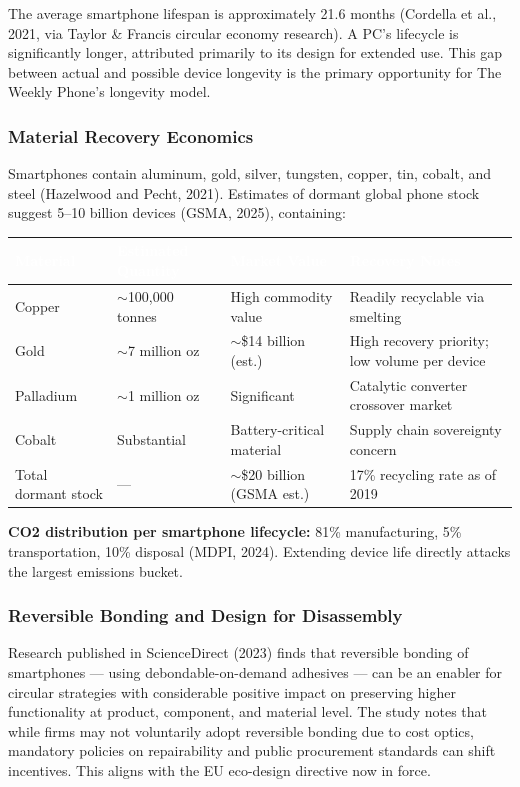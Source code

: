 \documentclass[11pt,letterpaper]{article}
\newcommand{\tableheader}[1]{\textbf{\sffamily\textcolor{white}{#1}}}
\begin{document}
The average smartphone lifespan is approximately 21.6 months (Cordella et al., 2021, via Taylor \& Francis circular economy research). A PC's lifecycle is significantly longer, attributed primarily to its design for extended use. This gap between actual and possible device longevity is the primary opportunity for The Weekly Phone's longevity model.

\subsubsection{Material Recovery Economics}

Smartphones contain aluminum, gold, silver, tungsten, copper, tin, cobalt, and steel (Hazelwood and Pecht, 2021). Estimates of dormant global phone stock suggest 5--10 billion devices (GSMA, 2025), containing:

\begin{center}
\begin{tabularx}{\textwidth}{L{3cm}C{3cm}C{3cm}X}
\toprule
{}
\tableheader{Material} & \tableheader{Estimated Quantity} & \tableheader{Market Value} & \tableheader{Recovery Notes} \\
\midrule
Copper & $\sim$100,000 tonnes & High commodity value & Readily recyclable via smelting \\
Gold & $\sim$7 million oz & $\sim$\$14 billion (est.) & High recovery priority; low volume per device \\
Palladium & $\sim$1 million oz & Significant & Catalytic converter crossover market \\
Cobalt & Substantial & Battery-critical material & Supply chain sovereignty concern \\
Total dormant stock & --- & $\sim$\$20 billion (GSMA est.) & 17\% recycling rate as of 2019 \\
\bottomrule
\end{tabularx}
\end{center}

\textbf{CO2 distribution per smartphone lifecycle:} 81\% manufacturing, 5\% transportation, 10\% disposal (MDPI, 2024). Extending device life directly attacks the largest emissions bucket.

\subsubsection{Reversible Bonding and Design for Disassembly}

Research published in ScienceDirect (2023) finds that reversible bonding of smartphones --- using debondable-on-demand adhesives --- can be an enabler for circular strategies with considerable positive impact on preserving higher functionality at product, component, and material level. The study notes that while firms may not voluntarily adopt reversible bonding due to cost optics, mandatory policies on repairability and public procurement standards can shift incentives. This aligns with the EU eco-design directive now in force.
\end{document}
